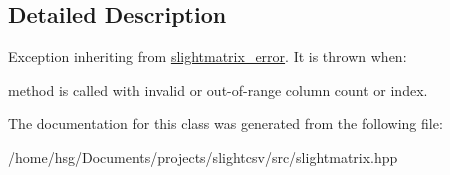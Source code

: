 \subsection{Detailed Description}
Exception inheriting from \hyperlink{classutils_1_1slightmatrix__error}{slightmatrix\+\_\+error}. It is thrown when\+:
\begin{DoxyItemize}
\item method is called with invalid or out-\/of-\/range column count or index. 
\end{DoxyItemize}

The documentation for this class was generated from the following file\+:\begin{DoxyCompactItemize}
\item 
/home/hsg/\+Documents/projects/slightcsv/src/slightmatrix.\+hpp\end{DoxyCompactItemize}
